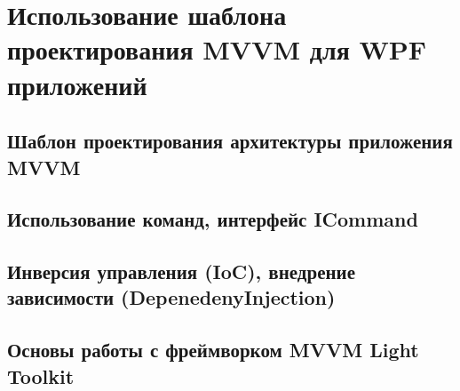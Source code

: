 
\section{Использование шаблона проектирования MVVM для WPF приложений}


\subsection{Шаблон проектирования архитектуры приложения MVVM}


\subsection{Использование команд, интерфейс ICommand}


\subsection{Инверсия управления (IoC), внедрение зависимости (DepenedenyInjection)}


\subsection{Основы работы с фреймворком MVVM Light Toolkit}